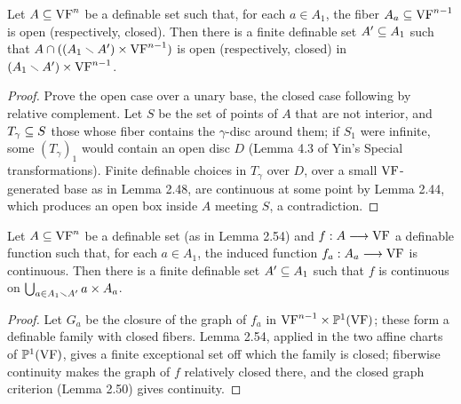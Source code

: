 \setcounter{theorem}{53}
\begin{lemma}
\label{lem-open-fiberwise}
\leanok
{}
Let $A \subseteq \mathrm{VF}^n$ be a definable set such that, for each $a \in A_1$, the fiber $A_a \subseteq \mathrm{VF}^{n-1}$ is open (respectively, closed). Then there is a finite definable set $A' \subseteq A_1$ such that $A \cap ((A_1 \smallsetminus A') \times \mathrm{VF}^{n-1})$ is open (respectively, closed) in $(A_1 \smallsetminus A') \times \mathrm{VF}^{n-1}$.
\end{lemma}

\begin{proof}
\leanok
Prove the open case over a unary base, the closed case following by relative complement. Let $S$ be the set of points of $A$ that are not interior, and $T_\gamma \subseteq S$ those whose fiber contains the $\gamma$-disc around them; if $S_1$ were infinite, some $(T_\gamma)_1$ would contain an open disc $D$ (Lemma 4.3 of Yin's Special transformations). Finite definable choices in $T_\gamma$ over $D$, over a small $\mathrm{VF}$-generated base as in Lemma 2.48, are continuous at some point by Lemma 2.44, which produces an open box inside $A$ meeting $S$, a contradiction.
\end{proof}

\setcounter{theorem}{54}
\begin{proposition}
\label{prop-continuity-fiberwise}
\leanok
{}
Let $A \subseteq \mathrm{VF}^n$ be a definable set (as in Lemma 2.54) and $f : A \longrightarrow \mathrm{VF}$ a definable function such that, for each $a \in A_1$, the induced function $f_a : A_a \longrightarrow \mathrm{VF}$ is continuous. Then there is a finite definable set $A' \subseteq A_1$ such that $f$ is continuous on $\bigcup_{a \in A_1 \smallsetminus A'} a \times A_a$.
\end{proposition}

\begin{proof}
\leanok
Let $G_a$ be the closure of the graph of $f_a$ in $\mathrm{VF}^{n-1} \times \mathbb{P}^1(\mathrm{VF})$; these form a definable family with closed fibers. Lemma 2.54, applied in the two affine charts of $\mathbb{P}^1(\mathrm{VF})$, gives a finite exceptional set off which the family is closed; fiberwise continuity makes the graph of $f$ relatively closed there, and the closed graph criterion (Lemma 2.50) gives continuity.
\end{proof}

